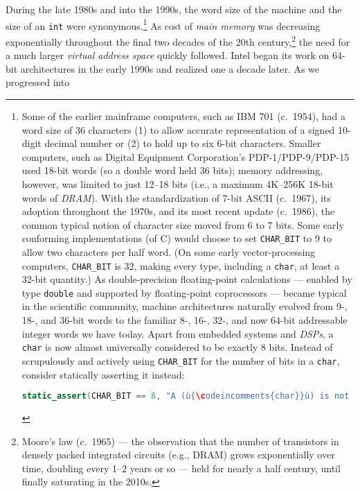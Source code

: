 During the late 1980s and into the 1990s, the word size of the machine and
the size of an \lstinline!int! were synonymous.{\cprotect\footnote{Some of
the earlier mainframe computers, such as IBM 701 (c.~1954), had a word
size of 36 characters (1) to allow accurate representation of a signed
10-digit decimal number or (2) to hold up to six 6-bit characters.
Smaller computers, such as Digital Equipment Corporation's
PDP-1/PDP-9/PDP-15 used 18-bit words (so a double word held 36 bits);
memory addressing, however, was limited to just 12--18 bits (i.e., a
maximum 4K--256K 18-bit words of \emph{DRAM}). With the standardization
of 7-bit ASCII (c.~1967), its adoption throughout the 1970s, and its most
recent update (c.~1986), the common typical notion of character size
moved from 6 to 7 bits. Some early conforming implementations (of C)
would choose to set \lstinline!CHAR_BIT! to 9 to allow two characters
per half word. (On some early vector-processing computers,
\lstinline!CHAR_BIT! is 32, making every type, including a
\lstinline!char!, at least a 32-bit quantity.) As double-precision floating-point calculations --- enabled by type \lstinline!double! and supported by floating-point coprocessors --- became typical in the scientific community, machine architectures
naturally evolved from 9-, 18-, and 36-bit words to the familiar 8-,
16-, 32-, and now 64-bit addressable integer words we have today.
Apart from embedded systems and \emph{DSPs}, a \lstinline!char! is now
almost universally considered to be exactly 8 bits. Instead of
scrupulously and actively using \lstinline!CHAR_BIT! for the number of bits
in a \lstinline!char!, consider statically asserting it instead:

\begin{lstlisting}[language=C++, basicstyle={\ttfamily\footnotesize}]
static_assert(CHAR_BIT == 8, "A (ù{\codeincomments{char}}ù) is not 8-bits on this CrAzY platform!");
\end{lstlisting}\vspace*{-1ex}
      }} As cost of \emph{main memory} was decreasing exponentially
throughout the final two decades of the 20th
century,{\cprotect\footnote{Moore's law (c.~1965) --- the observation
that the number of transistors in densely packed integrated circuits
(e.g., DRAM) grows exponentially over time, doubling every 1--2 years
or so --- held for nearly a half century, until finally saturating in
  the 2010s.}} the need for a much larger \emph{virtual address space}
quickly followed. Intel began its work on 64-bit architectures in the
early 1990s and realized one a decade later. As we progressed into
